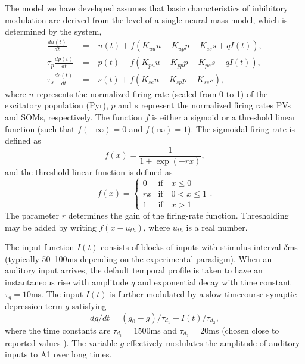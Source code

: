 \documentclass[a4paper,11pt]{article}
\begin{document}
The model we have developed assumes that basic characteristics of inhibitory modulation are derived from the level of a single neural mass model, which is determined by the system,
\begin{equation}\label{eq:wc}
 \begin{split}
 \frac{d u(t)}{d t} &= -u(t) + f\left( K_{uu} u - K_{up} p - K_{es}s + q I(t) \right),\\
 \tau_p\frac{d p(t)}{d t} &= -p(t) + f\left( K_{pu} u - K_{pp}p - K_{ps}s + q I(t)\right),\\
 \tau_s\frac{d s(t)}{d t} &= -s(t) + f(K_{se}u - K_{sp}p - K_{ss}s),
 \end{split}
\end{equation}
where $u$ represents the normalized firing rate (scaled from 0 to 1) of the excitatory population (Pyr), $p$ and $s$ represent the normalized firing rates PVs and SOMs, respectively. The function $f$ is either a sigmoid or a threshold linear function (such that $f(-\infty) = 0$ and $f(\infty)=1$). The sigmoidal firing rate is defined as
\begin{equation}\label{eq:sigmoid}
 f(x) = \frac{1}{1+\exp(-r x)},
\end{equation}
and the threshold linear function is defined as
\begin{equation}\label{eq:linear}
 f(x) = \left\{\begin{matrix}
         0 & \text{if} \quad x \leq 0\\
         r x & \text{if} \quad 0 < x \leq 1\\
         1 & \text{if} \quad x > 1
        \end{matrix}\right. .
\end{equation}
The parameter $r$ determines the gain of the firing-rate function. Thresholding may be added by writing $f(x-u_{th})$, where $u_{th}$ is a real number.

The input function $I(t)$ consists of blocks of inputs with stimulus interval $\delta$ms (typically 50--100ms depending on the experimental paradigm). When an auditory input arrives, the default temporal profile is taken to have an instantaneous rise with amplitude $q$ and exponential decay with time constant $\tau_q=10$ms. The input $I(t)$ is further modulated by a slow timecourse synaptic depression term $g$ satisfying
\begin{equation}\label{eq:thal}
 dg/dt = (g_0 - g)/\tau_{d_1} - I(t)/\tau_{d_2},
\end{equation}
where the time constants are $\tau_{d_1} = 1500$ms and $\tau_{d_2}=20$ms (chosen close to reported values \cite{natan2015complementary}). The variable $g$ effectively modulates the amplitude of auditory inputs to A1 over long times.
\end{document}
